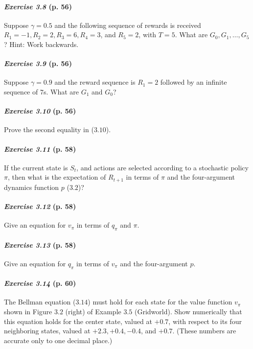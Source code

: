 \documentclass[10pt,a4paper]{article}
\begin{document}
\paragraph{\textit{Exercise 3.8} (p. 56)} Suppose $\gamma = 0.5$ and the following sequence of rewards is received $R_1 = -1,
R_2 = 2, R_3 = 6, R_4 = 3$, and $R_5 = 2$, with $T = 5$. What are $G_0, G_1, \hdots, G_5$? Hint:
Work backwards.

\paragraph{\textit{Exercise 3.9} (p. 56)} Suppose $\gamma = 0.9$ and the reward sequence is $R_1 = 2$ followed by an infinite sequence of $7$s. What are $G_1$ and $G_0$?
\paragraph{\textit{Exercise 3.10} (p. 56)} Prove the second equality in ($3.10$).

\paragraph{\textit{Exercise 3.11} (p. 58)} If the current state is $S_t$, and actions are selected according to a stochastic
policy $\pi$, then what is the expectation of $R_{t+1}$ in terms of $\pi$ and the four-argument dynamics function $p$ ($3.2$)?

\paragraph{\textit{Exercise 3.12} (p. 58)} Give an equation for $v_\pi$ in terms of $q_\pi$ and $\pi$.

\paragraph{\textit{Exercise 3.13} (p. 58)} Give an equation for $q_\pi$ in terms of $v_\pi$ and the four-argument $p$.

\paragraph{\textit{Exercise 3.14} (p. 60)} The Bellman equation ($3.14$) must hold for each state for the value function $v_\pi$ shown in Figure $3.2$ (right) of Example $3.5$ (Gridworld). Show numerically that this equation holds for the center state, valued at $+0.7$, with respect to its four neighboring states, valued at
$+2.3, +0.4, -0.4$, and $+0.7$. (These numbers are accurate only to one decimal place.)
\end{document}
